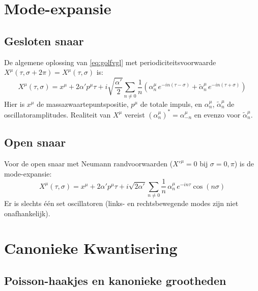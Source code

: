 \documentclass[12pt,a4paper]{article}
\begin{document}
\section{Mode-expansie}

\subsection{Gesloten snaar}

De algemene oplossing van \eqref{eq:golfvgl} met periodiciteitsvoorwaarde $X^\mu(\tau,\sigma+2\pi) = X^\mu(\tau,\sigma)$ is:
\begin{equation}
  X^\mu(\tau,\sigma) = x^\mu + 2\alpha' p^\mu\tau + i\sqrt{\frac{\alpha'}{2}}\sum_{n\neq 0}\frac{1}{n}\left(\alpha_n^\mu\,e^{-in(\tau-\sigma)} + \tilde\alpha_n^\mu\,e^{-in(\tau+\sigma)}\right)
  \label{eq:mode_gesloten}
\end{equation}
Hier is $x^\mu$ de massazwaartepuntspo\-sitie, $p^\mu$ de totale impuls, en $\alpha_n^\mu$, $\tilde\alpha_n^\mu$ de oscillatoramplitudes. Realiteit van $X^\mu$ vereist $(\alpha_n^\mu)^* = \alpha_{-n}^\mu$ en evenzo voor $\tilde\alpha_n^\mu$.

\subsection{Open snaar}

Voor de open snaar met Neumann randvoorwaarden ($X'^\mu = 0$ bij $\sigma = 0, \pi$) is de mode-expansie:
\begin{equation}
  X^\mu(\tau,\sigma) = x^\mu + 2\alpha' p^\mu\tau + i\sqrt{2\alpha'}\sum_{n\neq 0}\frac{1}{n}\,\alpha_n^\mu\,e^{-in\tau}\cos(n\sigma)
\end{equation}
Er is slechts \'e\'en set oscillatoren (links- en rechtsbewegende modes zijn niet onafhankelijk).

\section{Canonieke Kwantisering}

\subsection{Poisson-haakjes en kanonieke grootheden}
\end{document}
